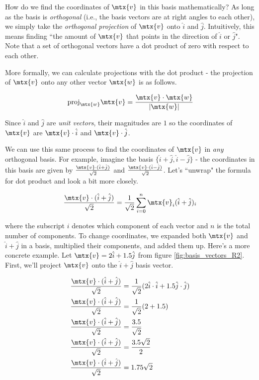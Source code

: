 How do we find the coordinates of $\mtx{v}$ in this basis mathematically? As
long as the basis is \textit{orthogonal} (i.e., the basis vectors are at right
angles to each other), we simply take the \textit{orthogonal projection} of
$\mtx{v}$ onto $\hat{i}$ and $\hat{j}$. Intuitively, this means finding ``the
amount of $\mtx{v}$ that points in the direction of $\hat{i}$ or $\hat{j}$".
Note that a set of orthogonal vectors have a dot product of zero with respect to
each other.

More formally, we can calculate projections with the dot product - the
projection of $\mtx{v}$ onto any other vector $\mtx{w}$ is as follows.

\begin{equation*}
  \text{proj}_\mtx{w} \mtx{v} = \frac{\mtx{v} \cdot \mtx{w}}{|\mtx{w}|}
\end{equation*}

Since $\hat{i}$ and $\hat{j}$ are \textit{unit vectors}, their magnitudes are
$1$ so the coordinates of $\mtx{v}$ are $\mtx{v} \cdot \hat{i}$ and
$\mtx{v} \cdot \hat{j}$.

We can use this same process to find the coordinates of $\mtx{v}$ in
\textit{any} orthogonal basis. For example, imagine the basis
$\{\hat{i} + \hat{j}, \hat{i} - \hat{j}\}$ - the coordinates in this basis are
given by $\frac{\mtx{v} \cdot (\hat{i} + \hat{j})}{\sqrt{2}}$ and
$\frac{\mtx{v} \cdot (\hat{i} - \hat{j})}{\sqrt{2}}$. Let's ``unwrap" the
formula for dot product and look a bit more closely.

\begin{equation*}
  \frac{\mtx{v} \cdot (\hat{i} + \hat{j})}{\sqrt{2}} =
    \frac{1}{\sqrt{2}} \sum_{i=0}^n \mtx{v}_i (\hat{i} + \hat{j})_i
\end{equation*}

where the subscript $i$ denotes which component of each vector and $n$ is the
total number of components. To change coordinates, we expanded both $\mtx{v}$
and $\hat{i} + \hat{j}$ in a basis, multiplied their components, and added them
up. Here's a more concrete example. Let $\mtx{v} = 2\hat{i} + 1.5\hat{j}$ from
figure \ref{fig:basis_vectors_R2}. First, we'll project $\mtx{v}$ onto the
$\hat{i} + \hat{j}$ basis vector.

\begin{align*}
  \frac{\mtx{v} \cdot (\hat{i} + \hat{j})}{\sqrt{2}} &=
    \frac{1}{\sqrt{2}} (2\hat{i} \cdot \hat{i} + 1.5\hat{j} \cdot \hat{j}) \\
  \frac{\mtx{v} \cdot (\hat{i} + \hat{j})}{\sqrt{2}} &=
    \frac{1}{\sqrt{2}} (2 + 1.5) \\
  \frac{\mtx{v} \cdot (\hat{i} + \hat{j})}{\sqrt{2}} &= \frac{3.5}{\sqrt{2}} \\
  \frac{\mtx{v} \cdot (\hat{i} + \hat{j})}{\sqrt{2}} &= \frac{3.5\sqrt{2}}{2} \\
  \frac{\mtx{v} \cdot (\hat{i} + \hat{j})}{\sqrt{2}} &= 1.75\sqrt{2}
\end{align*}

